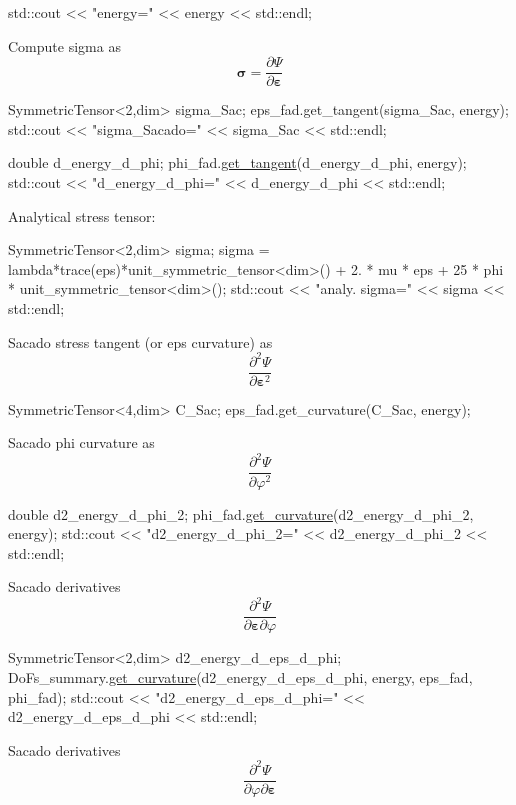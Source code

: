 \begin{DoxyCode}
std::cout << \textcolor{stringliteral}{"energy="} << energy << std::endl;
\end{DoxyCode}
 Compute sigma as \[ \boldsymbol{\sigma} = \frac{\partial \Psi}{\partial \boldsymbol{\varepsilon}} \] 
\begin{DoxyCode}
SymmetricTensor<2,dim> sigma\_Sac;
eps\_fad.get\_tangent(sigma\_Sac, energy);
std::cout << \textcolor{stringliteral}{"sigma\_Sacado="} << sigma\_Sac << std::endl;

\textcolor{keywordtype}{double} d\_energy\_d\_phi;
phi\_fad.\hyperlink{classSacado__Wrapper_1_1SW__double2_ad51ba1e79171d60861b28098dfef903d}{get\_tangent}(d\_energy\_d\_phi, energy);
std::cout << \textcolor{stringliteral}{"d\_energy\_d\_phi="} << d\_energy\_d\_phi << std::endl;
\end{DoxyCode}
 Analytical stress tensor\+: 
\begin{DoxyCode}
SymmetricTensor<2,dim> sigma;
sigma = lambda*trace(eps)*unit\_symmetric\_tensor<dim>() + 2. * mu * eps + 25 * phi * 
      unit\_symmetric\_tensor<dim>();
std::cout << \textcolor{stringliteral}{"analy. sigma="} << sigma << std::endl;
\end{DoxyCode}
 Sacado stress tangent (or eps curvature) as \[ \frac{\partial^2 \Psi}{\partial \boldsymbol{\varepsilon}^2} \] 
\begin{DoxyCode}
SymmetricTensor<4,dim> C\_Sac;
eps\_fad.get\_curvature(C\_Sac, energy);
\end{DoxyCode}
 Sacado phi curvature as \[ \frac{\partial^2 \Psi}{\partial \varphi^2} \] 
\begin{DoxyCode}
\textcolor{keywordtype}{double} d2\_energy\_d\_phi\_2;
phi\_fad.\hyperlink{classSacado__Wrapper_1_1SW__double2_a7d3f3a21cd842645af9861bf50308825}{get\_curvature}(d2\_energy\_d\_phi\_2, energy);
std::cout << \textcolor{stringliteral}{"d2\_energy\_d\_phi\_2="} << d2\_energy\_d\_phi\_2 << std::endl;
\end{DoxyCode}
 Sacado derivatives \[ \frac{\partial^2 \Psi}{\partial \boldsymbol{\varepsilon} \partial \varphi} \] 
\begin{DoxyCode}
SymmetricTensor<2,dim> d2\_energy\_d\_eps\_d\_phi;
DoFs\_summary.\hyperlink{classSacado__Wrapper_1_1DoFs__summary_adf29bfda10814ecee9572a4751d34db0}{get\_curvature}(d2\_energy\_d\_eps\_d\_phi, energy, eps\_fad, phi\_fad);
std::cout << \textcolor{stringliteral}{"d2\_energy\_d\_eps\_d\_phi="} << d2\_energy\_d\_eps\_d\_phi << std::endl;
\end{DoxyCode}
 Sacado derivatives \[ \frac{\partial^2 \Psi}{\partial \varphi \partial \boldsymbol{\varepsilon}} \] 
